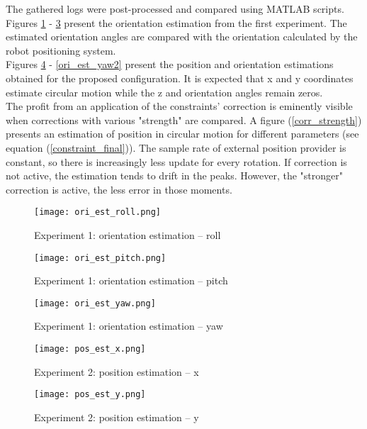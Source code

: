The gathered logs were post-processed and compared using MATLAB scripts. Figures \ref{ori_est_roll} - \ref{ori_est_yaw} present the orientation estimation from the first experiment. The estimated orientation angles are compared with the orientation calculated by the robot positioning system.\\

Figures \ref{pos_est_x} - \ref{ori_est_yaw2} present the position and orientation estimations obtained for the proposed configuration. It is expected that x and y coordinates estimate circular motion while the z and orientation angles remain zeros.\\

The profit from an application of the constraints' correction is eminently visible when corrections with various "strength" are compared.
A figure (\ref{corr_strength}) presents an estimation of position in circular motion for different parameters (see equation (\ref{constraint_final})). The sample rate of external position provider is constant, so there is increasingly less update for every rotation. If correction is not active, the estimation tends to drift in the peaks. However, the "stronger" correction is active, the less error in those moments.


\begin{figure}[p]
	\centering
	\texttt{[image: ori\_est\_roll.png]}
	\caption{Experiment 1: orientation estimation -- roll}
	\label{ori_est_roll}
\end{figure}

\begin{figure}[p]
	\centering
	\texttt{[image: ori\_est\_pitch.png]}
	\caption{Experiment 1: orientation estimation -- pitch}
	\label{ori_est_pitch}
\end{figure}


\begin{figure}[p]
	\centering
	\texttt{[image: ori\_est\_yaw.png]}
	\caption{Experiment 1: orientation estimation -- yaw}
	\label{ori_est_yaw}
\end{figure}

\begin{figure}[p]
	\centering
	\texttt{[image: pos\_est\_x.png]}
	\caption{Experiment 2: position estimation -- x}
	\label{pos_est_x}
\end{figure}

\begin{figure}[p]
	\centering
	\texttt{[image: pos\_est\_y.png]}
	\caption{Experiment 2: position estimation -- y}
	\label{pos_est_y}
\end{figure}


